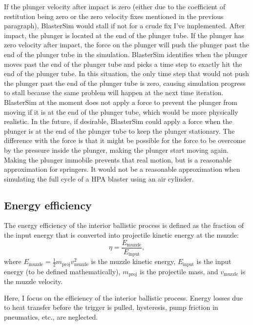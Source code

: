 If the plunger velocity after impact is zero (either due to the coefficient of restitution being zero or the zero velocity fixes mentioned in the previous paragraph), BlasterSim would stall if not for a crude fix I've implemented.
After impact, the plunger is located at the end of the plunger tube.
If the plunger has zero velocity after impact, the force on the plunger will push the plunger past the end of the plunger tube in the simulation.
BlasterSim identifies when the plunger moves past the end of the plunger tube and picks a time step to exactly hit the end of the plunger tube.
In this situation, the only time step that would not push the plunger past the end of the plunger tube is zero, causing simulation progress to stall because the same problem will happen at the next time iteration.
BlasterSim at the moment does not apply a force to prevent the plunger from moving if it is at the end of the plunger tube, which would be more physically realistic.
In the future, if desirable, BlasterSim could apply a force when the plunger is at the end of the plunger tube to keep the plunger stationary.
The difference with the force is that it might be possible for the force to be overcome by the pressure inside the plunger, making the plunger start moving again.
Making the plunger immobile prevents that real motion, but is a reasonable approximation for springers.
It would not be a reasonable approximation when simulating the full cycle of a HPA blaster using an air cylinder.

\subsection{Energy efficiency}\label{energy-efficiency}

The energy efficiency of the interior ballistic process is defined as the fraction of the input energy that is converted into projectile kinetic energy at the muzzle:
\begin{equation}
   \eta = \frac{E_\text{muzzle}}{E_\text{input}},
\end{equation}
where
$E_\text{muzzle} = \frac{1}{2} m_\text{proj} v_\text{muzzle}^2$ is the muzzle kinetic energy,
$E_\text{input}$ is the input energy (to be defined mathematically), 
$m_\text{proj}$ is the projectile mass, and
$v_\text{muzzle}$ is the muzzle velocity.

Here, I focus on the efficiency of the interior ballistic process.
Energy losses due to heat transfer before the trigger is pulled, hysteresis, pump friction in pneumatics, etc., are neglected.

